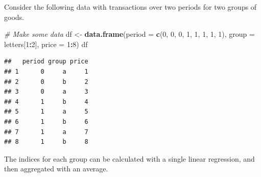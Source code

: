 \documentclass[]{article}
\newenvironment{Shaded}{\begin{snugshade}}{\end{snugshade}}
\newcommand{\CommentTok}[1]{\textcolor[rgb]{0.56,0.35,0.01}{\textit{#1}}}
\newcommand{\DataTypeTok}[1]{\textcolor[rgb]{0.13,0.29,0.53}{#1}}
\newcommand{\DecValTok}[1]{\textcolor[rgb]{0.00,0.00,0.81}{#1}}
\newcommand{\KeywordTok}[1]{\textcolor[rgb]{0.13,0.29,0.53}{\textbf{#1}}}
\newcommand{\NormalTok}[1]{#1}
\newcommand{\OperatorTok}[1]{\textcolor[rgb]{0.81,0.36,0.00}{\textbf{#1}}}
\newcommand{\StringTok}[1]{\textcolor[rgb]{0.31,0.60,0.02}{#1}}
\begin{document}
Consider the following data with transactions over two periods for two groups of goods.

\begin{Shaded}
\begin{Highlighting}[]
\CommentTok{# Make some data}
\NormalTok{df <-}\StringTok{ }\KeywordTok{data.frame}\NormalTok{(}\DataTypeTok{period =} \KeywordTok{c}\NormalTok{(}\DecValTok{0}\NormalTok{, }\DecValTok{0}\NormalTok{, }\DecValTok{0}\NormalTok{, }\DecValTok{1}\NormalTok{, }\DecValTok{1}\NormalTok{, }\DecValTok{1}\NormalTok{, }\DecValTok{1}\NormalTok{, }\DecValTok{1}\NormalTok{), }
                 \DataTypeTok{group =}\NormalTok{ letters[}\DecValTok{1}\OperatorTok{:}\DecValTok{2}\NormalTok{],}
                 \DataTypeTok{price =} \DecValTok{1}\OperatorTok{:}\DecValTok{8}\NormalTok{)}
\NormalTok{df}
\end{Highlighting}
\end{Shaded}

\begin{verbatim}
##   period group price
## 1      0     a     1
## 2      0     b     2
## 3      0     a     3
## 4      1     b     4
## 5      1     a     5
## 6      1     b     6
## 7      1     a     7
## 8      1     b     8
\end{verbatim}

The indices for each group can be calculated with a single linear regression, and then aggregated with an average.

\begin{Shaded}
\end{Shaded}
\end{document}
